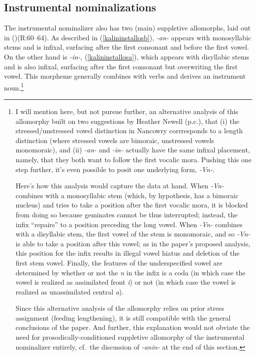 \documentclass[output=paper]{langscibook}
\newcounter{nexttmp}    %
\newcommand{\Next}{\setcounter{nexttmp}{\value{equation}}\stepcounter{nexttmp}(\thenexttmp)\xspace}
\begin{document}
\subsection{Instrumental nominalizations}\label{sec:kalin:3.2}

The instrumental nominalizer also has two (main) suppletive allomorphs, laid out in \Next (R:60--64). As described in (\ref{kalininstallosb}), \textit{-an-} appears with monosyllabic stems and is infixal, surfacing after the first consonant and before the first vowel. On the other hand is \textit{-in-}, (\ref{kalininstallosa}), which appears with disyllabic stems and is also infixal, surfacing after the first consonant but overwriting the first vowel. This morpheme generally combines with verbs and derives an instrument noun.\footnote{I will mention here, but not pursue further, an alternative analysis of this allomorphy built on two suggestions by Heather Newell (p.c.), that (i) the stressed/unstressed vowel distinction in Nancowry corrresponds to a length distinction (where stressed vowels are bimoraic, unstressed vowels monomoraic), and (ii) \textit{-an-} and \textit{-in-} actually have the same infixal placement, namely, that they both want to follow the first vocalic mora. Pushing this one step further, it's even possible to posit one underlying form, \textit{-Vn-}. 

Here's how this analysis would capture the data at hand. When \textit{-Vn-} combines with a monosyllabic stem (which, by hypothesis, has a bimoraic nucleus) and tries to take a position after the first vocalic mora, it is blocked from doing so because geminates cannot be thus interrupted; instead, the infix ``repairs'' to a position preceding the long vowel. When \textit{-Vn-} combines with a disyllabic stem, the first vowel of the stem is monomoraic, and so \textit{-Vn-} is able to take a position after this vowel; as in the paper's proposed analysis, this position for the infix results in illegal vowel hiatus and deletion of the first stem vowel. Finally, the features of the underspecified vowel are determined by whether or not the \textit{n} in the infix is a coda (in which case the vowel is realized as assimilated front \textit{i}) or not (in which case the vowel is realized as unassimilated central \textit{a}). 

Since this alternative analysis of the allomorphy relies on prior stress assignment (feeding lengthening), it is still compatible with the general conclusions of the paper. And further, this explanation would not obviate the need for prosodically-conditioned suppletive allomorphy of the instrumental nominalizer entirely, cf.\ the discussion of \textit{-anin-} at the end of this section.\label{kalinfnheather}} 
\end{document}
